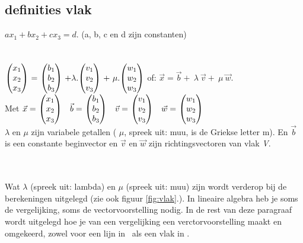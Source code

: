 
\subsection{definities vlak}
{$ ax_1 + bx_2 + cx_3 = d $. \quad  \quad (a, b, c en d zijn constanten) } \\

\\  \\

{  $ \vecdriesnel{x} \ =\ \vecdriesnel{b}  \ +  \lambda. \vecdriesnel{v} \   + \  \mu. \vecdriesnel{w} $ \qquad \qquad  of:  $ \vec{x}  =   \vec{b}  + \  \lambda \ \vec{v} + \  \mu \ \vec{w}  $. }\\ 
Met $ \vec{x}  = \   \vecdriesnel{x}  \quad    \vec{b} = \  \vecdriesnel{b} \quad    \vec{v} =  \  \vecdriesnel{v} \quad   \vec{w} =  \ \vecdriesnel{w} $  \\   $ \lambda $ en  $ \mu $ zijn variabele getallen ( $ \mu $, spreek uit: muu, is de Griekse letter m). En  $ \vec{b} $ is een constante beginvector en $ \vec{v}  $  en $ \vec{w}  $ zijn richtingsvectoren van vlak \textit{V}.\\ \\ \\ 


Wat  $ \lambda $ (spreek uit: lambda) en  $ \mu $ (spreek uit: muu) zijn wordt verderop bij de berekeningen uitgelegd (zie ook figuur  \ref{fig:vlak}.).  In lineaire algebra heb je soms de vergelijking, soms de vectorvoorstelling nodig. In de rest van deze paragraaf wordt uitgelegd hoe je van een vergelijking een verctorvoorstelling maakt en omgekeerd, zowel voor een lijn in \RT \ als een vlak in \RD. 

